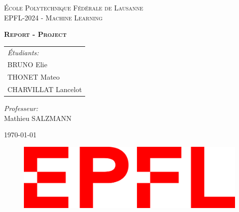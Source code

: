 \begin{titlepage}
   \begin{center}
        \vspace*{1cm}

        \LARGE
        \textsc{École Polytechnique Fédérale de Lausanne \\
                 EPFL-2024 - Machine Learning\\}

        \vspace{2.5cm}
        \huge
        \textbf{\textsc{Report - Project}}
    \end{center}
        
    \Large
    \vspace{2.5cm}
    \begin{tabular}{l}
        \emph{Étudiants:}\\
        BRUNO Elie\\
        THONET Mateo \\
        CHARVILLAT Lancelot \\
    \end{tabular}

    \begin{flushright}
        \Large
        \vspace{2.5cm}
        \emph{Professeur:} \\
        Mathieu SALZMANN
    \end{flushright}
        
    \begin{center}
        \Large
        \vspace{2.5cm}
        \today
        
        \vfill
        \large

        \begin{figure}[!b]
            \centering
            \includegraphics[scale=0.075]{./images/logo.png}
        \end{figure}
   \end{center}
\end{titlepage}